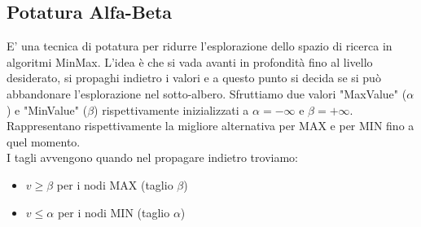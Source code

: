 \documentclass{article}
\begin{document}
\subsection{Potatura Alfa-Beta}
E' una tecnica di potatura per ridurre l’esplorazione dello spazio di ricerca in algoritmi MinMax. L'idea è che si vada avanti in profondità fino al livello desiderato, si propaghi indietro i valori e a questo punto si decida se si può abbandonare l’esplorazione nel sotto-albero.
Sfruttiamo due valori "MaxValue" ($\alpha$) e "MinValue" ($\beta$) rispettivamente inizializzati a $\alpha=-\infty$ e $\beta=+\infty$. Rappresentano rispettivamente la migliore alternativa per MAX e per MIN fino a quel momento. \\
I tagli avvengono quando nel propagare indietro troviamo: 
\begin{itemize}
    \item $v \geq \beta$ per i nodi MAX (taglio $\beta$)
    \item $v \leq \alpha$ per i nodi MIN (taglio $\alpha$) 
\end{itemize}
\end{document}
